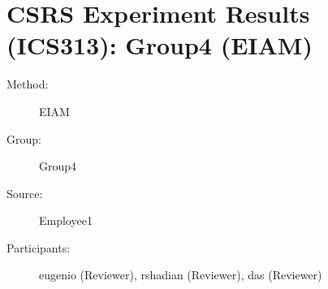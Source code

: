 
%          
\chapter {CSRS Experiment Results (ICS313): Group4 (EIAM)}
\small
	  

\begin{description}
\item [Method:] EIAM
\item [Group:] Group4
\item [Source:] Employee1
\item [Participants:] eugenio (Reviewer), rshadian (Reviewer), das (Reviewer)
\end{description}
